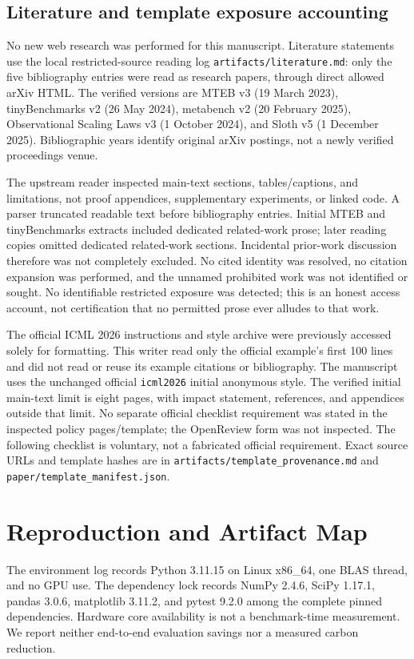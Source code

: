 \documentclass{article}
\begin{document}
\subsection{Literature and template exposure accounting}
\label{app:sources}
No new web research was performed for this manuscript. Literature statements use the local restricted-source reading log \texttt{artifacts/literature.md}: only the five bibliography entries were read as research papers, through direct allowed arXiv HTML. The verified versions are MTEB v3 (19 March 2023), tinyBenchmarks v2 (26 May 2024), metabench v2 (20 February 2025), Observational Scaling Laws v3 (1 October 2024), and Sloth v5 (1 December 2025). Bibliographic years identify original arXiv postings, not a newly verified proceedings venue.

The upstream reader inspected main-text sections, tables/captions, and limitations, not proof appendices, supplementary experiments, or linked code. A parser truncated readable text before bibliography entries. Initial MTEB and tinyBenchmarks extracts included dedicated related-work prose; later reading copies omitted dedicated related-work sections. Incidental prior-work discussion therefore was not completely excluded. No cited identity was resolved, no citation expansion was performed, and the unnamed prohibited work was not identified or sought. No identifiable restricted exposure was detected; this is an honest access account, not certification that no permitted prose ever alludes to that work.

The official ICML 2026 instructions and style archive were previously accessed solely for formatting. This writer read only the official example's first 100 lines and did not read or reuse its example citations or bibliography. The manuscript uses the unchanged official \texttt{icml2026} initial anonymous style. The verified initial main-text limit is eight pages, with impact statement, references, and appendices outside that limit. No separate official checklist requirement was stated in the inspected policy pages/template; the OpenReview form was not inspected. The following checklist is voluntary, not a fabricated official requirement. Exact source URLs and template hashes are in \texttt{artifacts/template\_provenance.md} and \texttt{paper/template\_manifest.json}.

\section{Reproduction and Artifact Map}
\label{app:reproduction}
The environment log records Python 3.11.15 on Linux x86\_64, one BLAS thread, and no GPU use. The dependency lock records NumPy 2.4.6, SciPy 1.17.1, pandas 3.0.6, matplotlib 3.11.2, and pytest 9.2.0 among the complete pinned dependencies. Hardware core availability is not a benchmark-time measurement. We report neither end-to-end evaluation savings nor a measured carbon reduction.
\end{document}
